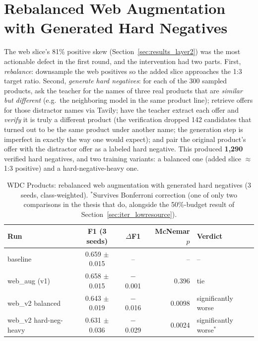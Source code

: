 \documentclass[a4paper,oneside,bibliography=totoc]{scrbook}
\begin{document}
\section{Rebalanced Web Augmentation with Generated Hard Negatives}
\label{sec:iter_webv2}

The web slice's 81\% positive skew (Section~\ref{sec:results_layer2}) was the most actionable defect in the first round, and the intervention had two parts. First, \emph{rebalance}: downsample the web positives so the added slice approaches the 1:3 target ratio. Second, \emph{generate hard negatives}: for each of the 300 sampled products, ask the teacher for the names of three real products that are \emph{similar but different} (e.g.\ the neighboring model in the same product line); retrieve offers for those distractor names via Tavily; have the teacher extract each offer and \emph{verify} it is truly a different product (the verification dropped 142 candidates that turned out to be the same product under another name; the generation step is imperfect in exactly the way one would expect); and pair the original product's offer with the distractor offer as a labeled hard negative. This produced \textbf{1{,}290} verified hard negatives, and two training variants: a balanced one (added slice $\approx$ 1:3 positive) and a hard-negative-heavy one.

\begin{table}[!htbp]
  \centering
  \small
  \begin{tabular}{lccrl}
    \toprule
    \textbf{Run} & \textbf{F1 (3 seeds)} & \textbf{$\Delta$F1} & \textbf{McNemar $p$} & \textbf{Verdict} \\
    \midrule
    baseline & 0.659 $\pm$ 0.015 & -- & -- & -- \\
    web\_aug (v1) & 0.658 $\pm$ 0.015 & $-$0.001 & 0.396 & tie \\
    web\_v2 balanced & 0.643 $\pm$ 0.019 & $-$0.016 & 0.0098 & significantly worse \\
    web\_v2 hard-neg-heavy & 0.631 $\pm$ 0.036 & $-$0.029 & 0.0024 & significantly worse$^{*}$ \\
    \bottomrule
  \end{tabular}
  \caption{WDC Products: rebalanced web augmentation with generated hard negatives (3 seeds, class-weighted). $^{*}$Survives Bonferroni correction (one of only two comparisons in the thesis that do, alongside the 50\%-budget result of Section~\ref{sec:iter_lowresource}).}
  \label{tab:webv2}
\end{table}
\end{document}
